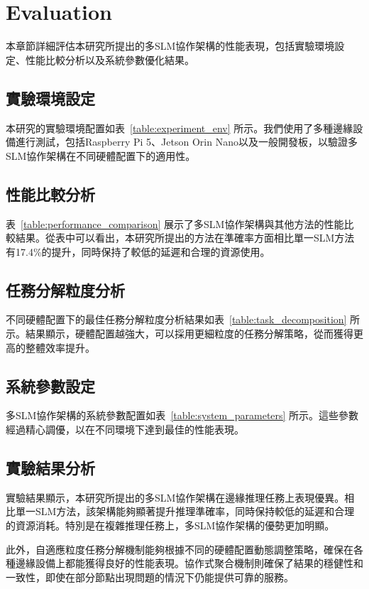 \chapter{Evaluation}

本章節詳細評估本研究所提出的多SLM協作架構的性能表現，包括實驗環境設定、性能比較分析以及系統參數優化結果。

\section{實驗環境設定}

本研究的實驗環境配置如表~\ref{table:experiment_env} 所示。我們使用了多種邊緣設備進行測試，包括Raspberry Pi 5、Jetson Orin Nano以及一般開發板，以驗證多SLM協作架構在不同硬體配置下的適用性。



\section{性能比較分析}

表~\ref{table:performance_comparison} 展示了多SLM協作架構與其他方法的性能比較結果。從表中可以看出，本研究所提出的方法在準確率方面相比單一SLM方法有17.4\%的提升，同時保持了較低的延遲和合理的資源使用。



\section{任務分解粒度分析}

不同硬體配置下的最佳任務分解粒度分析結果如表~\ref{table:task_decomposition} 所示。結果顯示，硬體配置越強大，可以採用更細粒度的任務分解策略，從而獲得更高的整體效率提升。



\section{系統參數設定}

多SLM協作架構的系統參數配置如表~\ref{table:system_parameters} 所示。這些參數經過精心調優，以在不同環境下達到最佳的性能表現。



\section{實驗結果分析}

實驗結果顯示，本研究所提出的多SLM協作架構在邊緣推理任務上表現優異。相比單一SLM方法，該架構能夠顯著提升推理準確率，同時保持較低的延遲和合理的資源消耗。特別是在複雜推理任務上，多SLM協作架構的優勢更加明顯。

此外，自適應粒度任務分解機制能夠根據不同的硬體配置動態調整策略，確保在各種邊緣設備上都能獲得良好的性能表現。協作式聚合機制則確保了結果的穩健性和一致性，即使在部分節點出現問題的情況下仍能提供可靠的服務。 